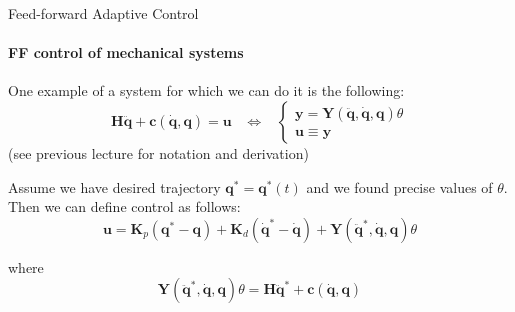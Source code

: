 \documentclass{beamer}
\begin{document}
\begin{frame}{Feed-forward Adaptive Control}
\framesubtitle{FF control of mechanical systems}
\begin{flushleft}

One example of a system for which we can do it is the following:
\[
\mathbf H \ddot {\mathbf q} + \mathbf c(\dot {\mathbf q}, \mathbf q) = \mathbf u
\; \; \; \Leftrightarrow \; \; \; 
\begin{cases}
\mathbf y = \mathbf Y (\ddot {\mathbf q}, \dot {\mathbf q}, \mathbf q) \theta \\
\mathbf u \equiv \mathbf y
\end{cases}
\]
%
(see previous lecture for notation and derivation)

\bigskip

Assume we have desired trajectory $\mathbf q^* = \mathbf q^*(t)$ and we found precise values of $\theta$. Then we can define control as follows:
%
\[
\mathbf u = \mathbf K_p (\mathbf q^* - \mathbf q) +
            \mathbf K_d (\dot{\mathbf q}^* - \dot{\mathbf q}) +
            \mathbf Y (\ddot {\mathbf q}^*, \dot {\mathbf q}, \mathbf q) \theta
\]

where 
\[
\mathbf Y (\ddot {\mathbf q}^*, \dot {\mathbf q}, \mathbf q) \theta = 
\mathbf H \ddot {\mathbf q}^* + \mathbf c(\dot {\mathbf q}, \mathbf q)
\]

\end{flushleft}
\end{frame}
\end{document}

